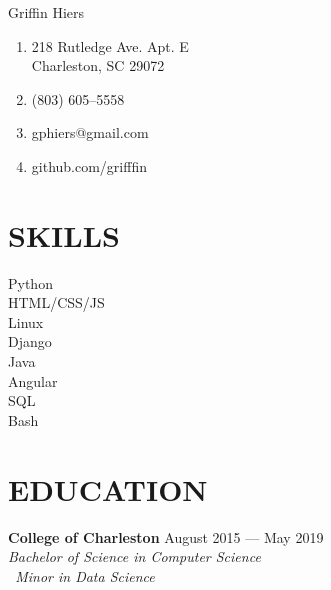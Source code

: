 \documentclass[letterpaper,14pt]{extarticle}
\begin{document}
\begin{multicols}{2}
  \vspace*{25pt}
  \huge {Grif\phantom{}f\phantom{}in Hiers}
  \normalsize \\

  \begin{enumerate}[noitemsep]
    \item[]{\faHome{} 218 Rutledge Ave. Apt. E\\Charleston, SC 29072}
    \item[]{\faPhone{} (803) 605--5558}
    \item[]{\faEnvelope{} gphiers@gmail.com}
    \item[]{\faGithub{} github.com/grif\phantom{}f\phantom{}fin}
  \end{enumerate}
\end{multicols}
\vspace*{13pt}

\section*{SKILLS}
\begin{multicols}{4}
  Python\\
  HTML/CSS/JS\\
  Linux\\
  Django\\
  Java\\
  Angular\\
  SQL\\
  Bash\\
\end{multicols}

\section*{EDUCATION}
  \textbf{College of Charleston}
  \hspace*{\fill}
  \textcolor{color2}{August 2015 --- May 2019}
  \\
  \textcolor{color2}{
    \textit{
      \qquad{}Bachelor of Science in Computer Science
      \\
      \qquad{}\ Minor in Data Science
    }
  }
\end{document}
